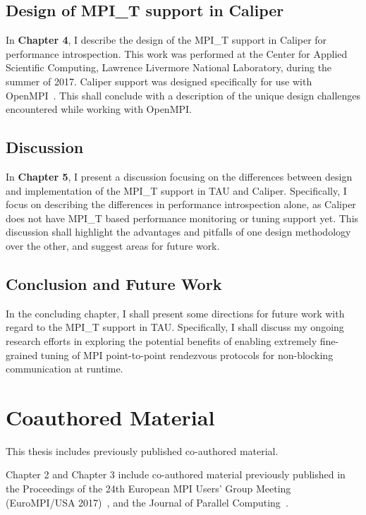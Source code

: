 \subsection {Design of MPI\_T support in Caliper}
In \textbf{Chapter 4}, I describe the design of the MPI\_T support in Caliper for performance introspection. This work was performed at the Center for Applied Scientific Computing, Lawrence Livermore National Laboratory, during the summer of 2017. Caliper support was designed specifically for use with OpenMPI~\cite{OpenMPI}. This shall conclude with a description of the unique design challenges encountered while working with OpenMPI.

\subsection {Discussion}
In \textbf{Chapter 5}, I present a discussion focusing on the differences between design and implementation of the MPI\_T support in TAU and Caliper. Specifically, I focus on describing the differences in performance introspection alone, as Caliper does not have MPI\_T based performance monitoring or tuning support yet. This discussion shall highlight the advantages and pitfalls of one design methodology over the other, and suggest areas for future work. 

\subsection {Conclusion and Future Work}
In the concluding chapter, I shall present some directions for future work with regard to the MPI\_T support in TAU. Specifically, I shall discuss my ongoing research efforts in exploring the potential benefits of enabling extremely fine-grained tuning of MPI point-to-point rendezvous protocols for non-blocking communication at runtime.

\section {Coauthored Material}
This thesis includes previously published co-authored material. 
\par Chapter 2 and Chapter 3 include co-authored material previously published in the Proceedings of the 24th European MPI Users' Group Meeting (EuroMPI/USA 2017)~\cite{EuroMPI}, and the Journal of Parallel Computing~\cite{ParCo}.
